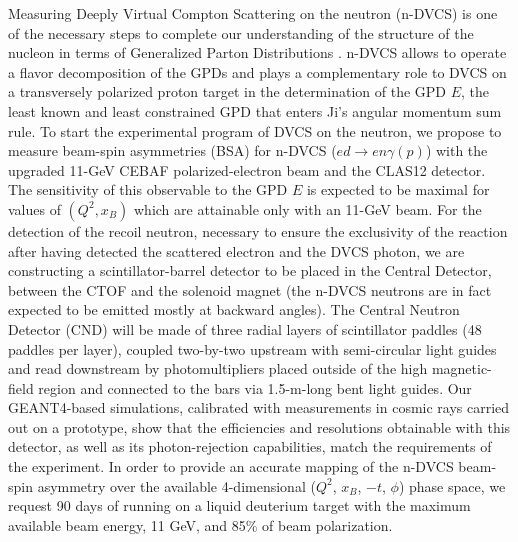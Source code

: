 Measuring Deeply Virtual Compton Scattering on the neutron (n-DVCS) is one of the necessary steps to complete our understanding of the structure of the nucleon in terms of Generalized Parton Distributions . n-DVCS allows to operate a flavor decomposition of the GPDs and plays a complementary role to DVCS on a transversely polarized proton target in the determination of the GPD $E$, the least known and least constrained GPD that enters Ji's angular momentum sum rule. To start the experimental program of DVCS on the neutron, we propose to measure beam-spin asymmetries (BSA) for n-DVCS ($ed\to en\gamma(p)$) with the upgraded 11-GeV CEBAF polarized-electron beam and the CLAS12 detector. The sensitivity of this observable to the GPD $E$ is expected to be maximal for values of $(Q^2, x_B)$ which are attainable only with an 11-GeV beam. 
For the detection of the recoil neutron, necessary to ensure the exclusivity of the reaction after having detected the scattered electron and the DVCS photon, we are constructing a scintillator-barrel detector to be placed in the Central Detector, between the CTOF and the solenoid magnet (the n-DVCS neutrons are in fact expected to be emitted mostly at backward angles). The Central Neutron Detector (CND) will be made of three radial layers of scintillator paddles (48 paddles per layer), coupled two-by-two upstream with semi-circular light guides and read downstream by photomultipliers placed outside of the high magnetic-field region and connected to the bars via 1.5-m-long bent light guides. Our GEANT4-based simulations, calibrated with measurements in cosmic rays carried out on a prototype, show that the efficiencies and resolutions obtainable with this detector, as well as its photon-rejection capabilities, match the requirements of the experiment. 
In order to provide an accurate mapping of the n-DVCS beam-spin asymmetry over the available 4-dimensional ($Q^2$, $x_B$, $-t$, $\phi$) phase space, we request 90 days of running on a liquid deuterium target with the maximum available beam energy, 11 GeV, and 85\% of beam polarization. 
